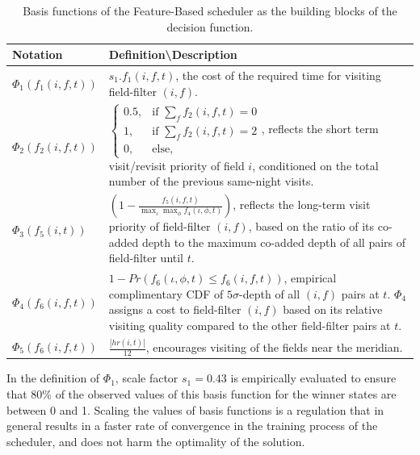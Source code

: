 \documentclass[11pt]{article}
\theoremstyle{definition}
\begin{document}
\begin{table}[h]
\caption{Basis functions of the Feature-Based scheduler as the building blocks of the decision function.}
\begin{tabularx}{\textwidth}{| l | X |}
\hline
Notation & Definition\textbackslash Description\\ \hline \hline
$\Phi_1(f_1(i,f,t))$ & $s_1.f_1(i,f,t)$, the cost of the required time for visiting field-filter $(i,f)$.\\ \hline
$\Phi_2(f_2(i,f,t))$ &$\begin{cases}0.5,& \text{if } \sum\limits_{f}{f_2(i,f,t)} = 0\\ 1,& \text{if } \sum\limits_{f}{f_2(i,f,t)} = 2\\ 0,  & \text{else,}\end{cases}$, \newline reflects the short term visit/revisit priority of field $i$, conditioned on the total number of the previous same-night visits.\\ \hline
$\Phi_3(f_5(i,t))$ &  $(1 - \frac{f_5(i,f,t)}{\max_\iota \max_\phi f_4(\iota,\phi,t)})$, reflects the long-term visit priority of field-filter $(i,f)$, based on the ratio of its co-added depth to the maximum co-added depth of all pairs of field-filter until $t$.\\ \hline
$\Phi_4(f_6(i,f,t))$ & $1 - Pr(f_6(\iota,\phi,t) \leq f_6(i,f,t))$, empirical complimentary CDF of $5\sigma$-depth of all $(i,f)$ pairs at $t$. $\Phi_4$ assigns a cost to field-filter $(i,f)$ based on its relative visiting quality compared to the other field-filter pairs at $t$.\\ \hline
$\Phi_5(f_6(i,f,t))$ &  $\frac{|hr(i,t)|}{12}$, encourages visiting of the fields near the meridian.\\ \hline
\end{tabularx}
\end{table}\label{tab_commonBF}
In the definition of $\Phi_1$, scale factor $s_1= 0.43$ is empirically evaluated to ensure that 80\% of the observed values of this basis function for the winner states are between 0 and 1. Scaling the values of basis functions is a regulation that in general results in a faster rate of convergence in the training process of the scheduler, and does not harm the optimality of the solution.
\end{document}
